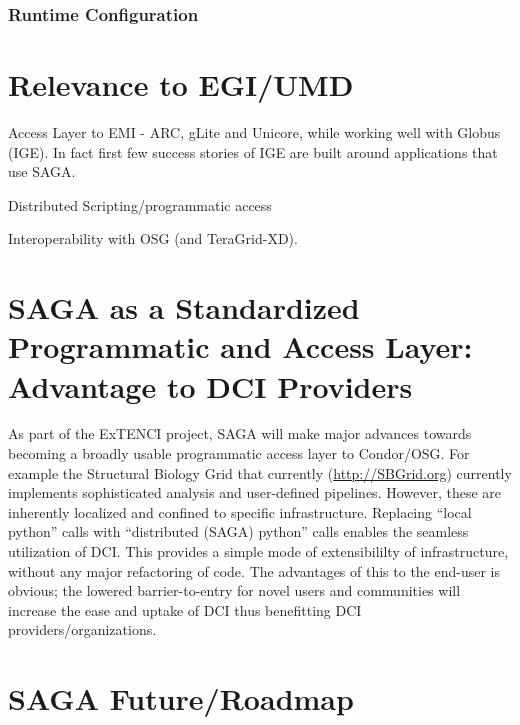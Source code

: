\documentclass[12pt]{article}
\begin{document}
\subsubsection*{Runtime Configuration}

   
\section{Relevance to EGI/UMD}

Access Layer to EMI - ARC, gLite and Unicore, while working well with
Globus (IGE). In fact first few success stories of IGE are built
around applications that use SAGA.

Distributed Scripting/programmatic access

Interoperability with OSG (and TeraGrid-XD).

\section{SAGA as a Standardized Programmatic and Access Layer:
  Advantage to DCI Providers}

As part of the ExTENCI project, SAGA will make major advances towards
becoming a broadly usable programmatic access layer to Condor/OSG.
For example the Structural Biology Grid that currently
(\url{http://SBGrid.org}) currently implements sophisticated analysis
and user-defined pipelines. However, these are inherently localized
and confined to specific infrastructure.  Replacing ``local python''
calls with ``distributed (SAGA) python'' calls enables the seamless
utilization of DCI. This provides a simple mode of extensibililty of
infrastructure, without any major refactoring of code. The advantages
of this to the end-user is obvious; the lowered barrier-to-entry for
novel users and communities will increase the ease and uptake of DCI
thus benefitting DCI providers/organizations.

\section{SAGA Future/Roadmap}



\end{document}
